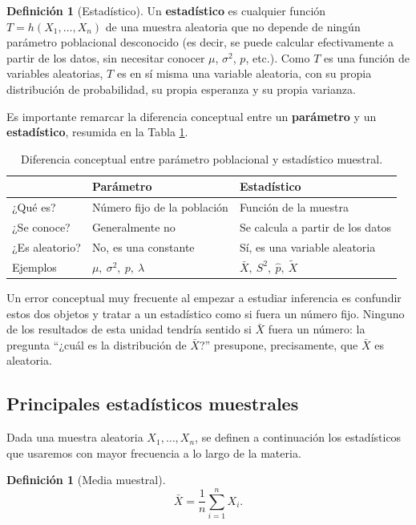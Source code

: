 \documentclass[11pt,a4paper]{article}
\theoremstyle{plain}
\theoremstyle{definition}
\newtheorem{definicion}[teorema]{Definición}
\theoremstyle{remark}
\begin{document}
\begin{definicion}[Estadístico]
Un \textbf{estadístico} es cualquier función $T = h(X_1,\dots,X_n)$ de una muestra aleatoria que no depende de ningún parámetro poblacional desconocido (es decir, se puede calcular efectivamente a partir de los datos, sin necesitar conocer $\mu$, $\sigma^2$, $p$, etc.). Como $T$ es una función de variables aleatorias, $T$ es en sí misma una variable aleatoria, con su propia distribución de probabilidad, su propia esperanza y su propia varianza.
\end{definicion}

Es importante remarcar la diferencia conceptual entre un \textbf{parámetro} y un \textbf{estadístico}, resumida en la Tabla \ref{tab:param-estad}.

\begin{table}[h]
\centering
\begin{tabular}{lll}
\toprule
 & \textbf{Parámetro} & \textbf{Estadístico} \\
\midrule
¿Qué es? & Número fijo de la población & Función de la muestra \\
¿Se conoce? & Generalmente no & Se calcula a partir de los datos \\
¿Es aleatorio? & No, es una constante & Sí, es una variable aleatoria \\
Ejemplos & $\mu,\ \sigma^2,\ p,\ \lambda$ & $\bar X,\ S^2,\ \hat p,\ \tilde X$ \\
\bottomrule
\end{tabular}
\caption{Diferencia conceptual entre parámetro poblacional y estadístico muestral.}
\label{tab:param-estad}
\end{table}

Un error conceptual muy frecuente al empezar a estudiar inferencia es confundir estos dos objetos y tratar a un estadístico como si fuera un número fijo. Ninguno de los resultados de esta unidad tendría sentido si $\bar X$ fuera un número: la pregunta ``¿cuál es la distribución de $\bar X$?'' presupone, precisamente, que $\bar X$ es aleatoria.

\subsection{Principales estadísticos muestrales}

Dada una muestra aleatoria $X_1,\dots,X_n$, se definen a continuación los estadísticos que usaremos con mayor frecuencia a lo largo de la materia.

\begin{definicion}[Media muestral]
$$\bar X = \frac{1}{n}\sum_{i=1}^{n} X_i.$$
\end{definicion}
\end{document}
